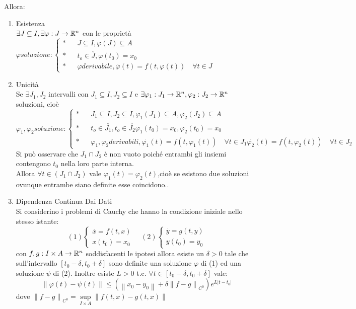 Allora:
\begin{enumerate}
	\item Esistenza\\
	$\exists J\subseteq I, \exists\varphi : J \to \mathbb{R}^n$ con le proprietà\\
	$\varphi soluzione:
	\left\{
	\begin{matrix}
	\ast && J\subseteq I, \varphi(J)\subseteq{A}\\
	\ast && t_o\in\overset{\circ}{J}, \varphi(t_0)=x_0\\
	\ast && \varphi derivabile, \overset{\cdot}{\varphi}(t)=f(t,\varphi(t)) \quad\forall t\in J\end{matrix}\right.$
	\item Unicità\\
	Se $\exists J_1,J_2$ intervalli con $J_1\subseteq I,J_2\subseteq I$ e $\exists \varphi_1:J_1\to \mathbb{R}^n, \varphi_2:J_2\to \mathbb{R}^n$ soluzioni, cioè\\
	$\varphi_1,\varphi_2 soluzione:
	\left\{
	\begin{matrix}
	\ast && J_1\subseteq I,J_2\subseteq I, \varphi_1(J_1)\subseteq{A},\varphi_2(J_2)\subseteq{A}\\
	\ast && t_o\in\overset{\circ}{J_1},t_o\in\overset{\circ}{J_2} \varphi_1(t_0)=x_0, \varphi_2(t_0)=x_0\\
	\ast && \varphi_1,\varphi_2 derivabili, \overset{\cdot}{\varphi_1}(t)=f(t,\varphi_1(t)) \quad\forall t\in J_1
	\overset{\cdot}{\varphi_2}(t)=f(t,\varphi_2(t)) \quad\forall t\in J_2
	\end{matrix}\right.$
	Si può osservare che $J_1\cap J_2$ è non vuoto poiché entrambi gli insiemi contengono $t_0$ nella loro parte interna.\\
	Allora $\forall t \in(J_1\cap J_2)$ vale $\varphi_1(t)=\varphi_2(t)$,cioè se esistono due soluzioni ovunque entrambe siano definite esse coincidono..\\
	\item Dipendenza Continua Dai Dati\\
	Si considerino i problemi di Cauchy che hanno la condizione iniziale nello stesso istante:
	$$ 
	(1)\left\{
	\begin{matrix}
	\overset{\cdot}{x}=f(t,x)\\x(t_0)=x_0
	\end{matrix}
	\right.\quad
	(2)\left\{
	\begin{matrix}
	\overset{\cdot}{y}=g(t,y)\\y(t_0)=y_0
	\end{matrix}
	\right.
	$$
	con $f,g:I\times A \to \mathbb{R}^n$ soddisfacenti le ipotesi allora esiste un $\delta >0$ tale che sull'intervallo $\left[ t_0-\delta,t_0+\delta \right]$ sono definite una soluzione $\varphi$ di (1) ed una soluzione $\psi$ di (2). Inoltre esiste $L>0$ t.c. $\forall t\in \left[t_0-\delta,t_0+\delta\right]$ vale:
	$$ 
	\left\| \varphi(t)-\psi(t) \right\| 
	\le 
	(\left\| x_0-y_0 \right\|+\delta\left\| f-g \right\|_{C^0})e^{L|t-t_0|}  
	$$
	dove $\left\| f-g \right\|_{C^0}=\sup\limits_{I\times A}\left\|f(t,x)-g(t,x)\right\|$
\end{enumerate}
